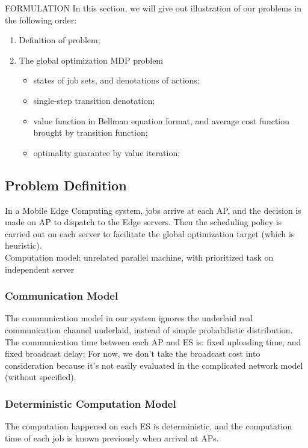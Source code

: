 \documentclass[10pt, conference, letterpaper]{IEEEtran}
\begin{document}
    \begin{section}{FORMULATION}
        \label{sec:formulation}
        In this section, we will give out illustration of our problems in the following order:
        \begin{enumerate}
            \item Definition of problem;
            \item The global optimization MDP problem
            \begin{itemize}
                \item states of job sets, and denotations of actions;
                \item single-step transition denotation;
                \item value function in Bellman equation format, and average cost function brought by transition function;
                \item optimality guarantee by value iteration;
            \end{itemize}
        \end{enumerate} 

        \subsection{Problem Definition}
        In a Mobile Edge Computing system, jobs arrive at each AP, and the decision is made on AP to dispatch to the Edge servers. Then the scheduling policy is carried out on each server to facilitate the global optimization target (which is heuristic). \\
        Computation model: unrelated parallel machine, with prioritized task on independent server

            \subsubsection{Communication Model}
            The communication model in our system ignores the underlaid real communication channel underlaid, instead of simple probabilistic distribution.
            The communication time between each AP and ES is: fixed uploading time, and fixed broadcast delay;
            For now, we don't take the broadcast cost into consideration because it's not easily evaluated in the complicated network model (without specified).

            \subsubsection{Deterministic Computation Model}
            The computation happened on each ES is deterministic, and the computation time of each job is known previously when arrival at APs.


\end{section}
\end{document}
